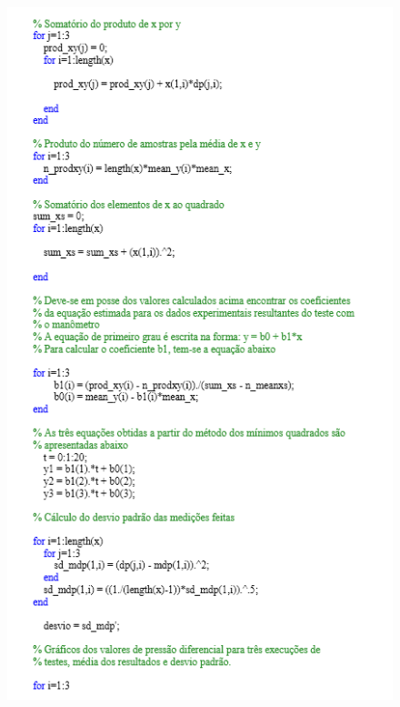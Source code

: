 \begin{apendicesenv}
\begin{figure}[H]
		\centering
			\includegraphics[scale=1.0]{figuras/rotina2.png}
		\label{rotina2}
\end{figure}


\end{apendicesenv}
